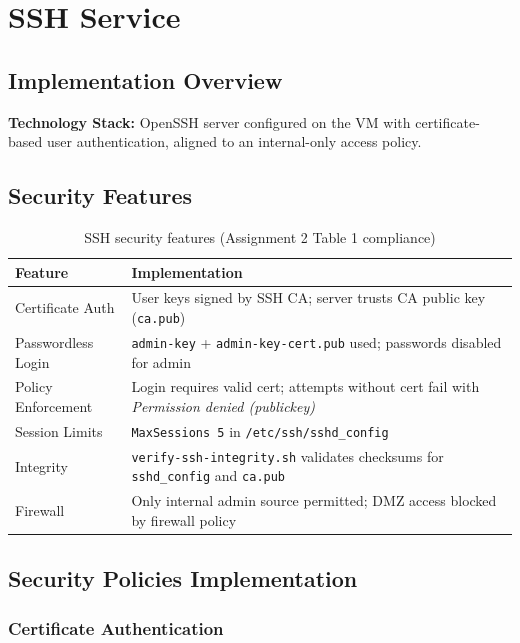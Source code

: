
\section{SSH Service}

\subsection{Implementation Overview}

\textbf{Technology Stack:} OpenSSH server configured on the VM with certificate-based user authentication, aligned to an internal-only access policy.

\subsection{Security Features}

\begin{table}[H]
\centering
\begin{tabular}{|l|p{10cm}|}
\hline
\textbf{Feature} & \textbf{Implementation} \\
\hline
Certificate Auth & User keys signed by SSH CA; server trusts CA public key (\texttt{ca.pub}) \\
\hline
Passwordless Login & \texttt{admin-key} + \texttt{admin-key-cert.pub} used; passwords disabled for admin \\
\hline
Policy Enforcement & Login requires valid cert; attempts without cert fail with \emph{Permission denied (publickey)} \\
\hline
Session Limits & \texttt{MaxSessions 5} in \texttt{/etc/ssh/sshd\_config} \\
\hline
Integrity & \texttt{verify-ssh-integrity.sh} validates checksums for \texttt{sshd\_config} and \texttt{ca.pub} \\
\hline
Firewall & Only internal admin source permitted; DMZ access blocked by firewall policy \\
\hline
\end{tabular}
\caption{SSH security features (Assignment 2 Table 1 compliance)}
\end{table}

\subsection{Security Policies Implementation}

\subsubsection{Certificate Authentication}

